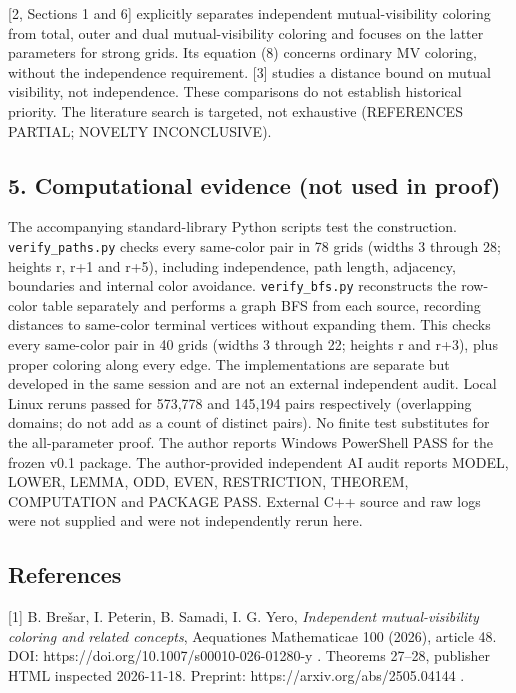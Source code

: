 \documentclass[
  11pt,
]{article}
\begin{document}
{[}2, Sections 1 and 6{]} explicitly separates independent
mutual-visibility coloring from total, outer and dual mutual-visibility
coloring and focuses on the latter parameters for strong grids. Its
equation (8) concerns ordinary MV coloring, without the independence
requirement. {[}3{]} studies a distance bound on mutual visibility, not
independence. These comparisons do not establish historical priority.
The literature search is targeted, not exhaustive (REFERENCES PARTIAL;
NOVELTY INCONCLUSIVE).

\subsection{5. Computational evidence (not used in
proof)}\label{computational-evidence-not-used-in-proof}

The accompanying standard-library Python scripts test the construction.
\texttt{verify\_paths.py} checks every same-color pair in 78 grids
(widths 3 through 28; heights r, r+1 and r+5), including independence,
path length, adjacency, boundaries and internal color avoidance.
\texttt{verify\_bfs.py} reconstructs the row-color table separately and
performs a graph BFS from each source, recording distances to same-color
terminal vertices without expanding them. This checks every same-color
pair in 40 grids (widths 3 through 22; heights r and r+3), plus proper
coloring along every edge. The implementations are separate but
developed in the same session and are not an external independent audit.
Local Linux reruns passed for 573,778 and 145,194 pairs respectively
(overlapping domains; do not add as a count of distinct pairs). No
finite test substitutes for the all-parameter proof. The author reports
Windows PowerShell PASS for the frozen v0.1 package. The author-provided
independent AI audit reports MODEL, LOWER, LEMMA, ODD, EVEN,
RESTRICTION, THEOREM, COMPUTATION and PACKAGE PASS. External C++ source
and raw logs were not supplied and were not independently rerun here.

\subsection{References}\label{references}

{[}1{]} B. Brešar, I. Peterin, B. Samadi, I. G. Yero, \emph{Independent
mutual-visibility coloring and related concepts}, Aequationes
Mathematicae 100 (2026), article 48. DOI:
https://doi.org/10.1007/s00010-026-01280-y . Theorems 27--28, publisher
HTML inspected 2026-11-18. Preprint: https://arxiv.org/abs/2505.04144 .
\end{document}

